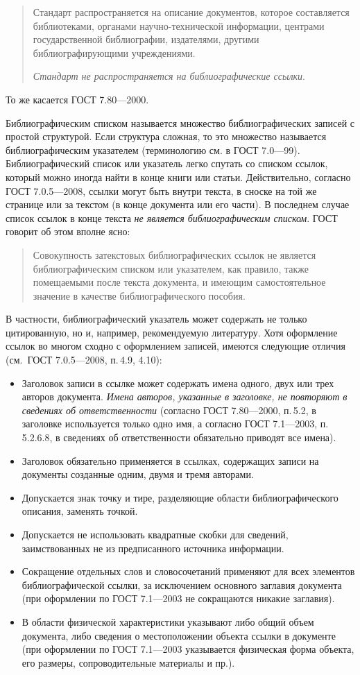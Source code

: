 \documentclass[10pt,a4paper,headings=small,numbers=enddot,english,russian]{ltxdockit}
\newcommand*{\gostbibname}[1][]{ГОСТ#1 7.1---2003\xspace}
\newcommand*{\gostcitename}[1][]{ГОСТ#1 7.0.5---2008\xspace}
\newcommand*{\gostheadname}[1][]{ГОСТ#1 7.80---2000\xspace}
\newcommand*{\gostbibref}[2][]{\gostbibname[#1], п.\,#2\xspace}
\newcommand*{\gostciteref}[2][]{\gostcitename[#1], п.\,#2\xspace}
\newcommand*{\gostheadref}[2][]{\gostheadname[#1], п.\,#2\xspace}
\begin{document}
\begin{quotation}
Стандарт распространяется на описание документов, которое составляется библиотеками,
  органами научно-технической информации, центрами государственной библиографии, издателями,
  другими библиографирующими учреждениями.

\emph{Стандарт не распространяется на библиографические ссылки}.
\end{quotation}
То же касается \gostheadname.

Библиографическим списком называется множество библиографических записей с простой структурой.
Если структура сложная, то это множество называется библиографическим указателем
  (терминологию см. в ГОСТ 7.0---99).
Библиографический список или указатель легко спутать со списком ссылок, который можно
  иногда найти в конце книги или статьи.
Действительно, согласно \gostcitename, ссылки могут быть внутри текста, в сноске на той же странице 
  или за текстом (в конце документа или его части).
В последнем случае список ссылок в конце текста \emph{не является библиографическим списком}.
ГОСТ говорит об этом вполне ясно:

\begin{quotation}
Совокупность затекстовых библиографических ссылок не является библиографическим списком или
  указателем, как правило, также помещаемыми после текста документа, и имеющим самостоятельное
  значение в качестве библиографического пособия.
\end{quotation}
В частности, библиографический указатель может содержать не только цитированную, но и, например,
  рекомендуемую литературу.
Хотя оформление ссылок во многом сходно с оформлением записей, имеются следующие отличия
  (см.~\gostciteref{}{4.9, 4.10}):
\begin{itemize}
  \item Заголовок записи в ссылке может содержать имена одного, двух или трех авторов документа.
    \emph{Имена авторов, указанные в заголовке, не повторяют в сведениях об ответственности}
    (согласно \gostheadref{}{5.2}, в заголовке используется только одно имя,
    а согласно \gostbibref{5.2.6.8},
    в сведениях об ответственности обязательно приводят все имена).
  \item Заголовок обязательно применяется в ссылках, содержащих записи на документы созданные
    одним, двумя и тремя авторами.
  \item Допускается знак точку и тире, разделяющие области библиографического описания, заменять
    точкой.
  \item Допускается не использовать квадратные скобки для сведений, заимствованных не из
    предписанного источника информации.
  \item Сокращение отдельных слов и словосочетаний применяют для всех элементов библиографической
    ссылки, за исключением основного заглавия документа
    (при оформлении по \gostbibname не сокращаются никакие заглавия).
  \item В области физической характеристики указывают либо общий объем документа, либо сведения о
    местоположении объекта ссылки в документе (при оформлении по \gostbibname указывается
    физическая форма объекта, его размеры, сопроводительные материалы и пр.).
\end{itemize}
\end{document}
